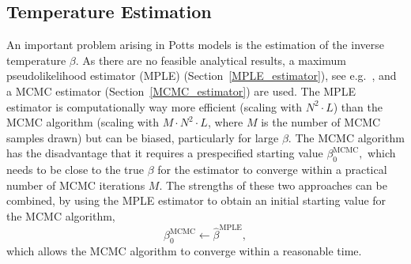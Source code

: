 \documentclass[12pt, twoside]{article}
\newcommand{\1}{\mathbb{1}}
\begin{document}
\subsection{Temperature Estimation}\label{temperature_estimation}
An important problem arising in Potts models is the estimation of the inverse temperature $\beta$. As there are no feasible analytical results, a maximum pseudolikelihood estimator (MPLE) (Section~\ref{MPLE_estimator}), see e.g.\ \cite{levada2009pseudo}, and a MCMC estimator (Section~\ref{MCMC_estimator}) are used. The MPLE estimator is computationally way more efficient (scaling with $N^2 \cdot L$) than the MCMC algorithm (scaling with $M \cdot N^2 \cdot L$, where $M$ is the number of MCMC samples drawn) but can be biased, particularly for large $\beta$. The MCMC algorithm has the disadvantage that it requires a prespecified starting value $\beta_0^\text{MCMC},$ which needs to be close to the true $\beta$ for the estimator to converge within a practical number of MCMC iterations $M$. The strengths of these two approaches can be combined, by using the MPLE estimator to obtain an initial starting value for the MCMC algorithm,
\begin{equation*}
\beta_0^\text{MCMC} \leftarrow \hat \beta^\text{MPLE},
\end{equation*}
which allows the MCMC algorithm to converge within a reasonable time.
\end{document}
